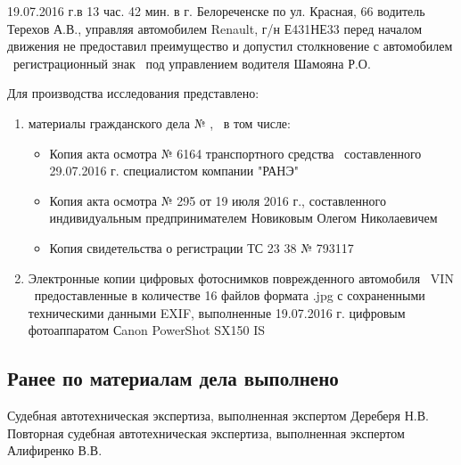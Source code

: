 19.07.2016 г.в 13 час.  42 мин. в г. Белореченске по ул. Красная, 66 водитель Терехов А.В., управляя автомобилем Renault, г/н Е431НЕ33 перед началом движения не предоставил преимущество и допустил столкновение с автомобилем \, регистрационный знак \, под управлением водителя Шамояна Р.О.  
\par Для производства исследования представлено:
\begin{enumerate}
\item материалы гражданского дела № \delonum, \, в том числе:
\begin{itemize}
	\item Копия акта осмотра № 6164 транспортного средства \, составленного 29.07.2016 г.  специалистом  компании "РАНЭ" 
	\item Копия акта осмотра № 295 от 19 июля 2016 г., составленного индивидуальным предпринимателем Новиковым Олегом Николаевичем
	\item Копия свидетельства о регистрации ТС 23 38 № 793117
	\end{itemize}
\item Электронные копии цифровых фотоснимков поврежденного автомобиля \, VIN \vin\, предоставленные в  количестве 16 файлов формата .jpg с сохраненными техническими данными EXIF, выполненные 19.07.2016 г. цифровым фотоаппаратом Сanon PowerShot SX150 IS 
\end{enumerate}

\subsection{Ранее по материалам дела выполнено}

\noindent Судебная автотехническая экспертиза, выполненная  экспертом Дереберя Н.В.\\
Повторная судебная автотехническая экспертиза, выполненная экспертом Алифиренко В.В.

